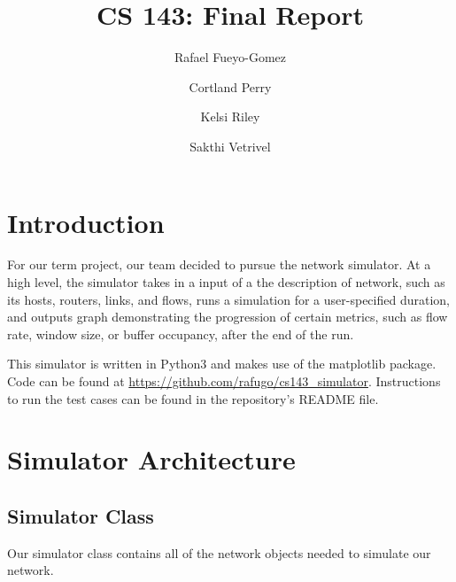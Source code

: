 \documentclass{article}
\begin{document}
%
\title{CS 143: Final Report}


\author{{Rafael Fueyo-Gomez}
\and
{Cortland Perry}
\and
{Kelsi Riley}
\and
{Sakthi Vetrivel}}
\maketitle
\section{Introduction}

For our term project, our team decided to pursue the network simulator. At a high level, the simulator takes in a input of a the description of network, such as its hosts, routers, links, and flows, runs a simulation for a user-specified duration, and outputs graph demonstrating the progression of certain metrics, such as flow rate, window size, or buffer occupancy, after the end of the run. 

This simulator is written in Python3 and makes use of the matplotlib package. Code can be found at \url{https://github.com/rafugo/cs143_simulator}. Instructions to run the test cases can be found in the repository's README file.

\section{Simulator Architecture}

\subsection{Simulator Class}

Our simulator class contains all of the network objects needed to simulate our network. 
\end{document}
